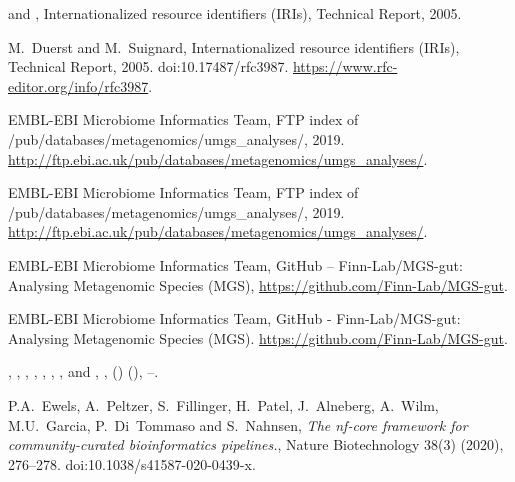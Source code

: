 \documentclass[ds,v1.1.2,openaccess]{iosart2x}%
\begin{document}
\begin{thebibliography}{}
%
\begin{botherref}
 and
,
Internationalized resource identifiers ({IRI}s),
Technical Report,
2005.
\end{botherref}
%
\OrigBibText
M.~Duerst and
M.~Suignard,
Internationalized resource identifiers ({IRI}s),
Technical Report,
2005.
doi:10.17487/rfc3987.
\url{https://www.rfc-editor.org/info/rfc3987}.
\endOrigBibText
{}
\endbibitem

%
\begin{botherref}
{EMBL-EBI Microbiome Informatics Team},
{FTP} index of /pub/databases/metagenomics/umgs\_analyses/,
2019.
\url{http://ftp.ebi.ac.uk/pub/databases/metagenomics/umgs\_analyses/}.
\end{botherref}
%
\OrigBibText
{EMBL-EBI Microbiome Informatics Team},
{FTP} index of /pub/databases/metagenomics/umgs\_analyses/,
2019.
\url{http://ftp.ebi.ac.uk/pub/databases/metagenomics/umgs\_analyses/}.
\endOrigBibText
{}
\endbibitem

%
\begin{botherref}
EMBL-EBI Microbiome Informatics Team,
{GitHub} -- Finn-Lab/{MGS}-gut: Analysing Metagenomic Species ({MGS}),
\url{https://github.com/Finn-Lab/MGS-gut}.
\end{botherref}
%
\OrigBibText
{EMBL-EBI Microbiome Informatics Team},
{GitHub} - Finn-Lab/{MGS}-gut: Analysing Metagenomic Species ({MGS}).
\url{https://github.com/Finn-Lab/MGS-gut}.
\endOrigBibText
{}
\endbibitem

%
\begin{barticle}
,
,
,
,
,
,
,
 and
,
,
()
(),
--.
\end{barticle}
%
\OrigBibText
P.A.~Ewels,
A.~Peltzer,
S.~Fillinger,
H.~Patel,
J.~Alneberg,
A.~Wilm,
M.U.~Garcia,
P.~Di~Tommaso and
S.~Nahnsen,
\textit{The nf-core framework for community-curated bioinformatics
pipelines.},
Nature Biotechnology
38(3)
(2020),
276--278.
doi:10.1038/s41587-020-0439-x.
\endOrigBibText
{}
\endbibitem


\end{thebibliography}
\end{document}
